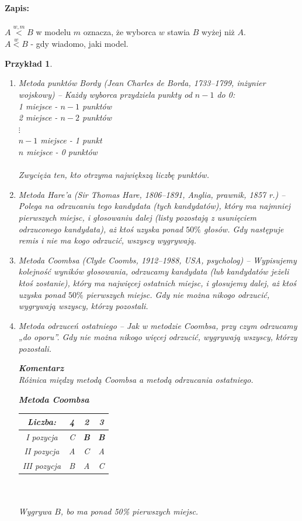 \documentclass[12pt,a4paper]{article}
\theoremstyle{break}
\newcommand{\Komentarz}[1]{
	\begin{mdframed}[style=zadanie]
		\textbf{Komentarz}\\
		#1
	\end{mdframed}
	}
\newtheorem{example}{Przykład}[section]
\begin{document}
	\noindent \textbf{Zapis:}\\\\
	$A\overset{w,m}{<}B$ w modelu $m$ oznacza, że wyborca $w$ stawia $B$ wyżej niż $A$.\\
	$A\overset{w}{<}B$ - gdy wiadomo, jaki model.
	
	\begin{example}
		\begin{enumerate}[1.]
			\item Metoda punktów Bordy (Jean Charles de Borda, 1733–1799, inżynier wojskowy) – Każdy wyborca przydziela punkty od $n-1$ do 0:\\
			1 miejsce - $n-1$ punktów\\
			2 miejsce - $n-2$ punktów\\
			$\vdots$ \\
			$n-1$ miejsce - 1 punkt\\
			$n$ miejsce - 0 punktów\\\\
			Zwycięża ten, kto otrzyma największą liczbę punktów.
			
			\item Metoda Hare'a (Sir Thomas Hare, 1806–1891, Anglia, prawnik, 1857 r.) – Polega na odrzucaniu tego kandydata (tych kandydatów), który ma najmniej pierwszych miejsc, i głosowaniu dalej (listy pozostają z usunięciem odrzuconego kandydata), aż ktoś uzyska ponad $50\%$ głosów. Gdy następuje remis i nie ma kogo odrzucić, wszyscy wygrywają.
			
			\item Metoda Coombsa (Clyde Coombs, 1912–1988, USA, psycholog) – Wypisujemy kolejność wyników głosowania, odrzucamy kandydata (lub kandydatów jeżeli ktoś zostanie), który ma najwięcej ostatnich miejsc, i głosujemy dalej, aż ktoś uzyska ponad $50\%$ pierwszych miejsc. Gdy nie można nikogo odrzucić, wygrywają wszyscy, którzy pozostali.
			
			\item Metoda odrzuceń ostatniego – Jak w metodzie Coombsa, przy czym odrzucamy „do oporu”. Gdy nie można nikogo więcej odrzucić, wygrywają wszyscy, którzy pozostali.
			
			\Komentarz{
				Różnica między metodą Coombsa a metodą odrzucania ostatniego.
				
				\textbf{Metoda Coombsa}\\
				\begin{tabular}{|c|c|c|c|}\hline
					Liczba: & 4 & 2 & 3 \\\hline
					I pozycja & C & \textbf{B} & \textbf{B} \\\hline
					II pozycja & A & C & A \\\hline
					III pozycja & B & A & C \\\hline
				\end{tabular}\\\\
				Wygrywa $B$, bo ma ponad 50\% pierwszych miejsc.\\
				
}
\end{enumerate}
\end{example}
\end{document}
